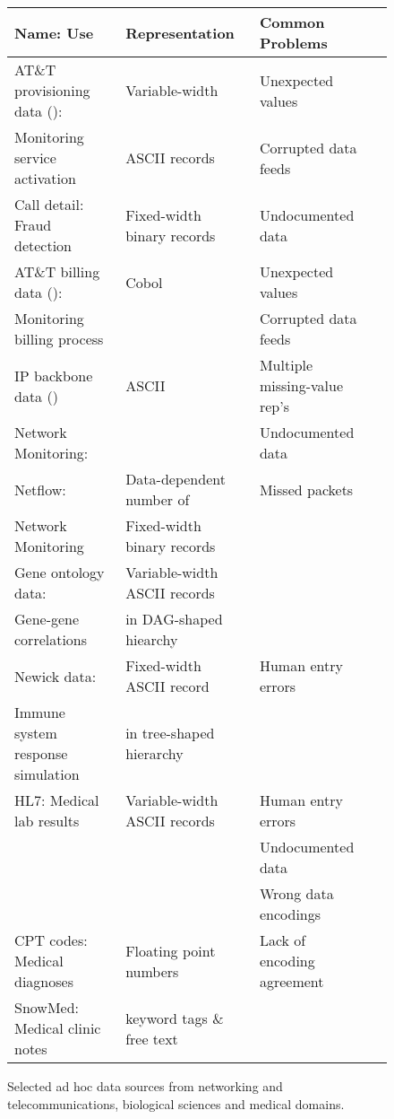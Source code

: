 \documentclass[11pt]{article}
\begin{document}
\begin{figure*}
\begin{center}
\begin{tabular}{@{}|l|l|l|l|}
\hline
Name: Use                           & Representation    
           & Common Problems \\ \hline\hline
AT\&T provisioning data (\dibbler{}): & Variable-width    
& Unexpected values \\ 
Monitoring service activation         & ASCII records     
& Corrupted data feeds \\ \hline
Call detail: Fraud detection                   & Fixed-width binary records  
&  Undocumented data\\\hline 
AT\&T billing data (\ningaui{}):      & Cobol  
& Unexpected values\\ 
Monitoring billing process   &                             
& Corrupted data feeds \\ \hline
IP backbone data (\darkstar{})  & ASCII  
& Multiple missing-value rep's \\
Network Monitoring:  &        
& Undocumented data \\ \hline
Netflow:                               & Data-dependent number of   
& Missed packets\\ 
Network Monitoring        & Fixed-width binary records  
& \\ \hline
Gene ontology data:        & Variable-width ASCII records 
&  \\
Gene-gene correlations & in DAG-shaped hiearchy 
& \\\hline
Newick data:                          & Fixed-width ASCII record 
& Human entry errors \\
Immune system response simulation & in tree-shaped hierarchy 
& \\
\hline
HL7:                 
Medical lab results 
& Variable-width ASCII records 
& Human entry errors \\
&& Undocumented data \\
&& Wrong data encodings \\ \hline
CPT codes:
Medical diagnoses & Floating point numbers & Lack of encoding agreement\\
\hline
SnowMed: Medical clinic notes
& keyword tags \& free text
& 
\\ \hline
\end{tabular}
\caption{Selected ad hoc data sources from networking and telecommunications,
biological sciences and medical domains.}
\label{figure:data-sources}
\end{center}
\end{figure*}
\end{document}
